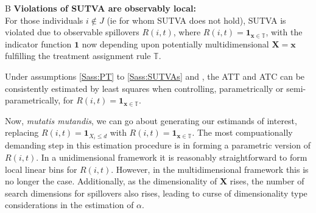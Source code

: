 \begin{assumption}{4}{B}
\label{Sass:SUTVAlM}
\textbf{Violations of SUTVA are observably local:} \\ 
For those individuals $i\notin J$ (ie for whom SUTVA does not hold), SUTVA is
violated due to observable spillovers $R(i,t)$, where 
$R(i,t)=\mathbf{1}_{\mathbf{x}\in \mathbb{T}}$, with the indicator function 
$\mathbf{1}$ now depending upon potentially multidimensional
$\mathbf{X=x}$
fulfilling the treatment assignment rule $\mathbb{T}$.
\end{assumption}

\begin{proposition}
\label{Pass:ATTnonP}
Under assumptions \ref{Sass:PT} to \ref{Sass:SUTVAs} and
, the ATT and ATC can be consistently estimated
by least squares when controlling, parametrically or
semi-parametrically, for $R(i,t)=\mathbf{1}_{\mathbf{x}\in
  \mathbb{T}}$. 
\end{proposition}

Now, \emph{mutatis mutandis}, we can go about generating our estimands of
interest, replacing $R(i,t)=\mathbf{1}_{X_i\leq d}$ with
$R(i,t)=\mathbf{1}_{\mathbf{x}\in \mathbb{T}}$.  The most compuationally
demanding step in this estimation procedure is in forming a parametric
version of $R(i,t)$.  In a unidimensional framework it is reasonably straightforward
to form local linear bins for $R(i,t)$.  However, in the multidimensional framework
this is no longer the case.  Additionally, as the dimensionality of $\mathbf{X}$
rises, the number of search dimensions for spillovers also rises, leading to 
curse of dimensionality type considerations in the estimation of $\alpha$.

